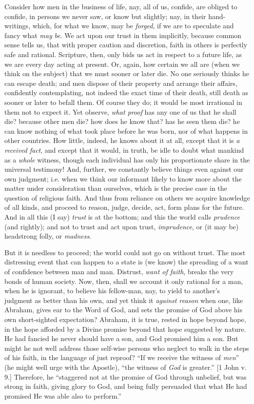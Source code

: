Consider how men in the business of life, nay, all of
us, confide, are obliged to confide, in persons we never
saw, or know but slightly; nay, in their hand-writings,
which, for what we know, may be \emph{forged}, if we are
to speculate and fancy what \emph{may} \emph{be}. We act
upon our trust in them implicitly, because common sense
tells us, that with proper caution and discretion, faith
in others is perfectly safe and rational. Scripture,
then, only bids us act in respect to a future life, as we
are every day acting at present. Or, again, how certain
we all are (when we think on the subject) that we must
sooner or later die. No one seriously thinks he can
escape death; and men dispose of their property and
arrange their affairs, confidently contemplating, not
indeed the exact time of their death, still death as
sooner or later to befall them. Of course they do; it
would be most irrational in them not to expect it. Yet
observe, \emph{what proof} has any one of us that he
shall die? because other men die? how does he know that?
has he seen them die? he can know nothing of what took
place before he was born, nor of what happens in other
countries. How little, indeed, he knows about it at all,
except that it is \emph{a} \emph{received fact}, and
except that it would, in truth, be idle to doubt what
mankind as a \emph{whole} witness, though each individual
has only his proportionate share in the universal
testimony! And, further, we constantly believe things
even against our own judgment; i.e. when we think our
informant likely to know more about the matter under
consideration than ourselves, which is the precise case
in the question of religious faith. And thus from
reliance on others we acquire knowledge of all kinds, and
proceed to reason, judge, decide, act, form plans for the
future. And in all this (I say) \emph{trust} is at the
bottom; and this the world calls \emph{prudence} (and
rightly); and not to trust and act upon trust, \emph{imprudence},
or (it may be) headstrong folly, or \emph{madness}.

But it is needless to proceed; the world could not go
on without trust. The most distressing event that can
happen to a state is (we know) the spreading of a want of
confidence between man and man. Distrust, \emph{want of
faith}, breaks the very bonds of human society. Now,
then, shall we account it only rational for a man, when
he is ignorant, to believe his fellow-man, nay, to yield
to another's judgment as better than his own, and yet
think it \emph{against reason} when one, like Abraham,
gives ear to the Word of God, and sets the promise of God
above his own short-sighted expectation? Abraham, it is
true, rested in hope beyond hope, in the hope afforded by
a Divine promise beyond that hope suggested by nature. He
had fancied he never should have a son, and God promised
him a son. But might he not well address those self-wise
persons who neglect to walk in the steps of his faith, in
the language of just reproof? ``If we receive the
witness of \emph{men}'' (he might well urge with the
Apostle), ``the witness of \emph{God} is
greater.'' [1 John v. 9.] Therefore, he
``staggered not at the promise of God through
unbelief, but was strong in faith, giving glory to God,
and being fully persuaded that what He had promised He
was able also to perform.''

